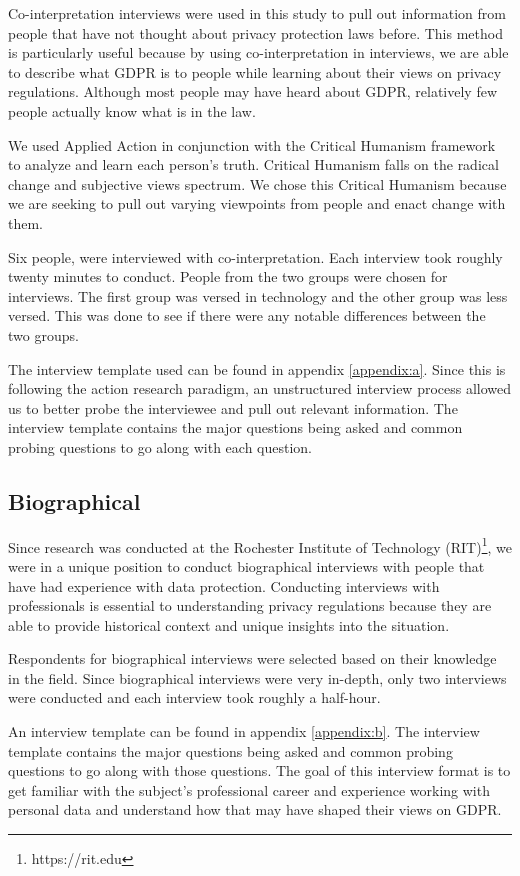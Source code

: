 \documentclass[12pt,
 reprint,
nofootinbib,
 amsmath,amssymb,
 aps,
]{revtex4-2}
\begin{document}
Co-interpretation interviews were used in this study to pull out information from people that have not thought about privacy protection laws before. This method is particularly useful because by using co-interpretation in interviews, we are able to describe what GDPR is to people while learning about their views on privacy regulations. Although most people may have heard about GDPR, relatively few people actually know what is in the law.

We used Applied Action in conjunction with the Critical Humanism framework to analyze and learn each person's truth. 
Critical Humanism falls on the radical change and subjective views spectrum. 
We chose this Critical Humanism because we are seeking to pull out varying viewpoints from people and enact change with them.

Six people, were interviewed with co-interpretation. Each interview took roughly twenty minutes to conduct. People from the two groups were chosen for  interviews. The first group was versed in technology and the other group was less versed. This was done to see if there were any notable differences between the two groups.

The interview template used can be found in appendix \ref{appendix:a}. 
Since this is following the action research paradigm, an unstructured interview process allowed us to better probe the interviewee and pull out relevant information.
The interview template contains the major questions being asked and common probing questions to go along with each question. 

\subsection{\label{sec:level2}Biographical}

Since research was conducted at the Rochester Institute of Technology (RIT)\footnote{https://rit.edu}, we were in a unique position to conduct biographical interviews with people that have had experience with data protection.
Conducting interviews with professionals is essential to understanding privacy regulations because they are able to provide historical context and unique insights into the situation.

Respondents for biographical interviews were selected based on their knowledge in the field. 
Since biographical interviews were very in-depth, only two interviews were conducted and each interview took roughly a half-hour. 

An interview template can be found in appendix \ref{appendix:b}.
The interview template contains the major questions being asked and common probing questions to go along with those questions. 
The goal of this interview format is to get familiar with the subject’s professional career and experience working with personal data and understand how that may have shaped their views on GDPR. 
\end{document}
